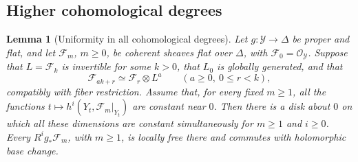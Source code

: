 \documentclass[11pt,a4paper]{article}
\numberwithin{equation}{section}
\newtheorem{lemma}[theorem]{Lemma}
\theoremstyle{definition}
\theoremstyle{remark}
\newcommand{\OO}{\mathcal O}\newcommand{\cX}{\mathcal X}
\begin{document}
\subsection{Higher cohomological degrees}

\begin{lemma}[Uniformity in all cohomological degrees]
\label{lem:uniform-higher}
Let $g:\mathcal Y\to\Delta$ be proper and flat, and let
$\mathcal F_m$, $m\ge0$, be coherent sheaves flat over $\Delta$,
with $\mathcal F_0=\OO_{\mathcal Y}$.
Suppose that $L=\mathcal F_k$ is invertible for some $k>0$,
that $L_0$ is globally generated, and that
\[
 \mathcal F_{ak+r}\simeq\mathcal F_r\otimes L^a
 \qquad(a\ge0,\ 0\le r<k),
\]
compatibly with fiber restriction. Assume that, for every fixed
$m\ge1$, all the functions
$t\mapsto h^i(Y_t,\mathcal F_m|_{Y_t})$ are constant near $0$.
Then there is a disk about $0$ on which all these dimensions are
constant simultaneously for $m\ge1$ and $i\ge0$. Every
$R^ig_*\mathcal F_m$, with $m\ge1$, is locally free there and
commutes with holomorphic base change.
\end{lemma}
\end{document}
